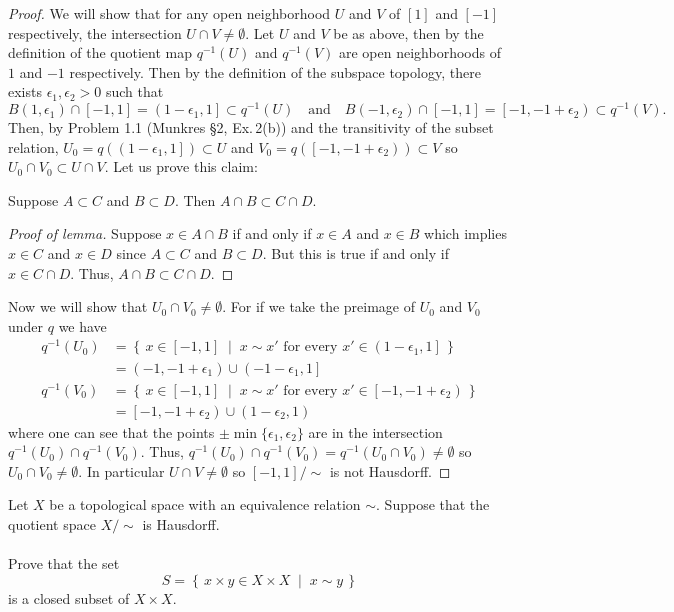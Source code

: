 \begin{proof}
We will show that for any open neighborhood $U$ and $V$ of $[1]$
and $[-1]$ respectively, the intersection $U\cap
V\neq\emptyset$. Let $U$ and $V$ be as above, then by the
definition of the quotient map $q^{-1}(U)$ and $q^{-1}(V)$ are
open neighborhoods of $1$ and $-1$ respectively. Then by the
definition of the subspace topology, there exists
$\epsilon_1,\epsilon_2>0$ such that
\[
B\left(1,\epsilon_1\right)\cap[-1,1]
=\left(1-\epsilon_1,1\right]
\subset q^{-1}(U)
\quad\text{and}\quad
B\left(-1,\epsilon_2\right)\cap[-1,1]
=\left[-1,-1+\epsilon_2\right)
\subset q^{-1}(V).
\]
Then, by Problem 1.1 (Munkres \S2, Ex.\,2(b)) and the transitivity
of the subset relation,
$U_0=q\left(\left(1-\epsilon_1,1\right]\right)\subset U$ and
$V_0=q\left(\left[-1,-1+\epsilon_2\right)\right)\subset V$ so
$U_0\cap V_0\subset U\cap V$. Let us prove this claim:
\begin{lemma}
Suppose $A\subset C$ and $B\subset D$. Then $A\cap B\subset C\cap
D$.
\end{lemma}
\begin{proof}[Proof of lemma]
\renewcommand\qedsymbol{$\clubsuit$}
Suppose $x\in A\cap B$ if and only if $x\in A$ and $x\in B$ which
implies $x\in C$ and $x\in D$ since $A\subset C$ and $B\subset
D$. But this is true if and only if $x\in C\cap D$. Thus, $A\cap
B\subset C\cap D$.
\end{proof}
Now we will show that $U_0\cap V_0\neq\emptyset$. For if we take the
preimage of $U_0$ and $V_0$ under $q$ we have
\begin{align*}
q^{-1}(U_0)&=\left\{\,x\in[-1,1]\;\middle|\;
\text{$x\sim x'$ for every $x'\in\left(1-\epsilon_1,1\right]$}\,\right\}\\
&=\left(-1,-1+\epsilon_1\right)\cup\left(-1-\epsilon_1,1\right]\\
q^{-1}(V_0)&=\left\{\,x\in[-1,1]\;\middle|\;
\text{$x\sim x'$ for every $x'\in\left[-1,-1+\epsilon_2\right)$}\,\right\}\\
&=\left[-1,-1+\epsilon_2\right)\cup\left(1-\epsilon_2,1\right)
\end{align*}
where one can see that the points
$\pm\min\{\epsilon_1,\epsilon_2\}$ are in the intersection
$q^{-1}(U_0)\cap q^{-1}\left(V_0\right)$. Thus,
$q^{-1}\left(U_0\right)\cap q^{-1}(V_0)=q^{-1}\left(U_0\cap
  V_0\right)\neq\emptyset$ so $U_0\cap V_0\neq\emptyset$. In
particular $U\cap V\neq\emptyset$ so $[-1,1]/{\sim}$ is not
Hausdorff.
\end{proof}
\newpage
\begin{problem}[E]
Let $X$ be a topological space with an equivalence relation
$\sim$. Suppose that the quotient space $X/\sim$ is Hausdorff.
\\\\
Prove that the set
\[
S=\left\{\,x\times y\in X\times X\;\middle|\;x\sim y\,\right\}
\]
is a closed subset of $X\times X$.
\end{problem}
